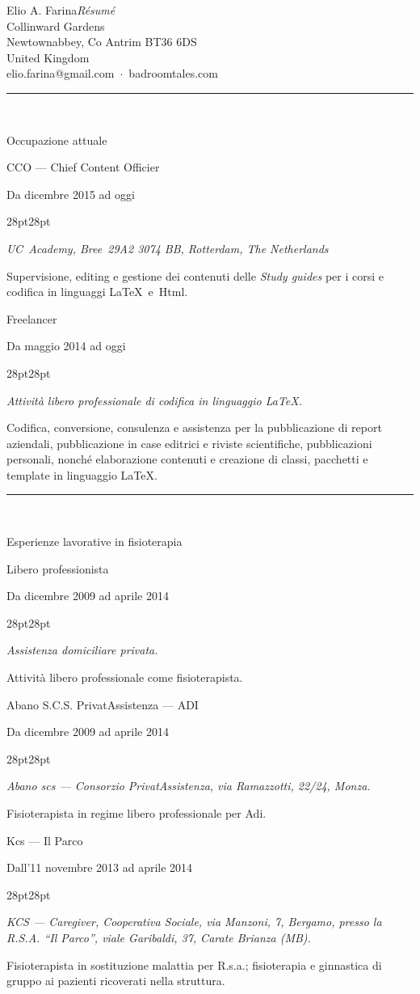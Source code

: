 \documentclass{article}
\newcommand{\titolo}[1]{\bgroup\rule{\linewidth}{1pt}\\[-14pt]
\null\hfill\fontsize{10pt}{12pt}\sc\selectfont\strut#1\\[21pt]\egroup}
\newcommand{\lavorofisio}[5]{%
{\fontsize{14pt}{17pt}\selectfont\strut#1}\hfill\strut#2\\[-7pt]
\begin{adjustwidth}{28pt}{28pt}
\fontsize{10pt}{12pt}\selectfont\strut\textit{#3}\\[2pt]
\fontsize{10pt}{12pt}\selectfont\strut#4\\[21pt]
\end{adjustwidth}}
\begin{document}
\raggedright
\\
elio.farina@gmail.com~$\cdot$~badroomtales.com
\egroup

\vspace{14pt}
\titolo{Occupazione attuale}
\lavorofisio{{CCO} --- Chief Content Officier}{Da dicembre 2015 ad oggi}{UC~Academy, Bree~29A2 3074 BB, Rotterdam, The Netherlands}{Supervisione, editing e gestione dei contenuti delle \textit{Study guides} per i corsi e codifica in linguaggi \LaTeX\ e~{\sc Html}.}{}

\lavorofisio{Freelancer}{Da maggio 2014 ad oggi}{Attivit\`a libero professionale di codifica in linguaggio \LaTeX.}{Codifica, conversione, consulenza e assistenza per la pubblicazione di report aziendali, pubblicazione in case editrici e riviste scientifiche, pubblicazioni personali, nonch\'e elaborazione contenuti e creazione di classi, pacchetti e template in linguaggio \LaTeX.}{}

\vspace{14pt}
\titolo{Esperienze lavorative in fisioterapia}
\lavorofisio{Libero professionista}{Da dicembre 2009 ad aprile 2014}{Assistenza domiciliare privata.}{Attivit\`a libero professionale come fisioterapista.}{pazienti privati.}

\lavorofisio{Abano S.C.S. PrivatAssistenza --- ADI}{Da dicembre 2009 ad aprile 2014}{Abano {scs} ---  Consorzio PrivatAssistenza, via Ramazzotti, 22/24, Monza.}{Fisioterapista in regime libero professionale per {\sc Adi}.}{Varie patologie che necessitano di assistenza domiciliare tramite ASL o privatamente.}

\lavorofisio{Kcs --- Il Parco}{Dall'11 novembre 2013 ad aprile 2014}{{KCS} ---  Caregiver, Cooperativa Sociale, via Manzoni, 7, Bergamo, presso la {R.S.A.} ``Il Parco'', viale Garibaldi, 37, Carate Brianza ({MB}).}{Fisioterapista in sostituzione malattia per {\sc R.s.a.}; fisioterapia e ginnastica di gruppo ai pazienti ricoverati nella struttura.}{anziani.}
\end{document}
